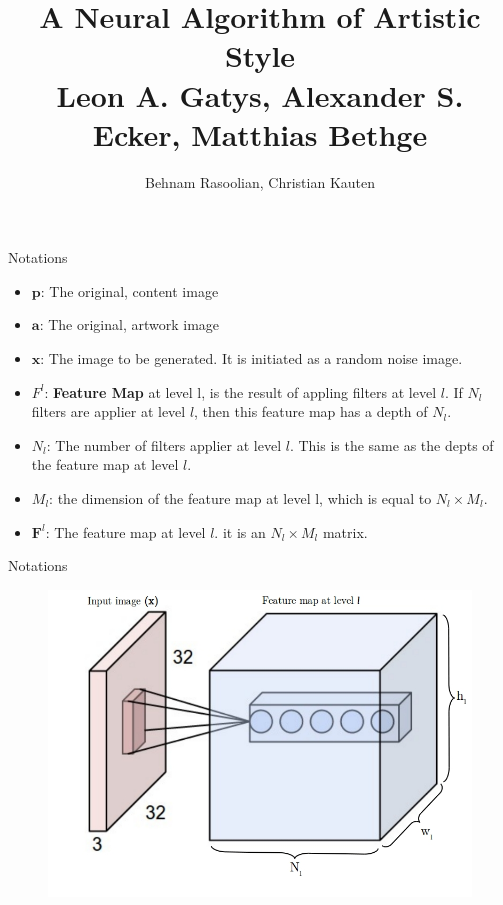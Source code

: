 \documentclass{beamer}
\title{A Neural Algorithm of Artistic Style \\ { \tiny Leon A. Gatys, Alexander S. Ecker, Matthias Bethge}}
\author{Behnam Rasoolian, Christian Kauten}
\institute{Auburn University}
\date{}
\begin{document}

\frame{\titlepage}

\begin{frame}{Notations}
    \begin{itemize}
        \item $\mathbf{p}$: The original, content image
        \item $\mathbf{a}$: The original, artwork image
        \item $\mathbf{x}$: The image to be generated. It is initiated as a
            random noise image.
        \item $F^l$: \textbf{Feature Map} at level l, is the result of appling
            filters at level $l$. If $N_l$ filters are applier at level $l$,
            then this feature map has a depth of $N_l$.
        \item $N_l$: The number of filters applier at level $l$. This is
            the same as the depts of the feature map at level
            $l$.
        \item $M_l$: the dimension of the feature map at level l, which
            is equal to $N_l \times M_l$.
        \item $\mathbf{F}^l$: The feature map at level $l$. it is an
            $N_l \times M_l$ matrix.
    \end{itemize}
\end{frame}

\begin{frame}{Notations}
    \begin{figure}[H]
        \centering
        \includegraphics[width=.8\textwidth]{img/levels.jpg}
    \end{figure}
\end{frame}
\end{document}
